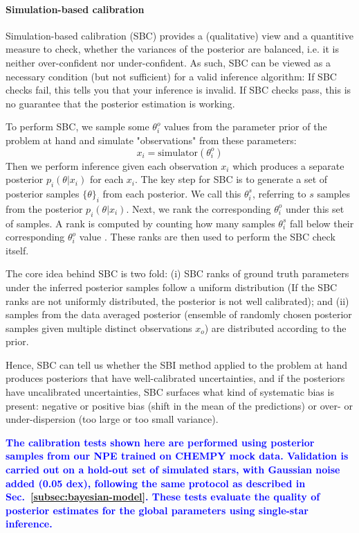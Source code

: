 \documentclass{aa}
\newcommand{\resub}[1]{\textbf{\textcolor{blue}{#1}}}
\begin{document}
\begin{appendix}
\paragraph{Simulation-based calibration}
Simulation-based calibration (SBC) provides a (qualitative) view and a quantitive measure to check, whether the variances of the posterior are balanced, i.e. it is neither over-confident nor under-confident. As such, SBC can be viewed as a necessary condition (but not sufficient) for a valid inference algorithm: If SBC checks fail, this tells you that your inference is invalid. If SBC checks pass, this is no guarantee that the posterior estimation is working.

To perform SBC, we sample some $\theta_i^o$ values from the parameter prior of the problem at hand and simulate "observations" from these parameters: 
\begin{equation}
    x_i = \text{simulator}(\theta_i^o)
\end{equation}
Then we perform inference given each observation $x_i$ which produces a separate posterior $p_i(\theta|x_i)$ for each $x_i$. The key step for SBC is to generate a set of posterior samples $\{\theta\}_i$ from each posterior. We call this $\theta_i^s$, referring to $s$ samples from the posterior $p_i(\theta|x_i)$. Next, we rank the corresponding $\theta_i^o$ under this set of samples. A rank is computed by counting how many samples $\theta_i^s$ fall below their corresponding $\theta_i^o$ value \citep[see section 4.1 in][]{Talts2018}. These ranks are then used to perform the SBC check itself.

The core idea behind SBC is two fold: (i) SBC ranks of ground truth parameters under the inferred posterior samples follow a uniform distribution (If the SBC ranks are not uniformly distributed, the posterior is not well calibrated); and (ii) samples from the data averaged posterior (ensemble of randomly chosen posterior samples given multiple distinct observations $x_o$) are distributed according to the prior.

Hence, SBC can tell us whether the SBI method applied to the problem at hand produces posteriors that have well-calibrated uncertainties, and if the posteriors have uncalibrated uncertainties, SBC surfaces what kind of systematic bias is present: negative or positive bias (shift in the mean of the predictions) or over- or under-dispersion (too large or too small variance).

\resub{The calibration tests shown here are performed using posterior samples from our NPE trained on CHEMPY mock data. Validation is carried out on a hold-out set of simulated stars, with Gaussian noise added (0.05 dex), following the same protocol as described in Sec.~\ref{subsec:bayesian-model}. These tests evaluate the quality of posterior estimates for the global parameters  using single-star inference.}


\end{appendix}
\end{document}
